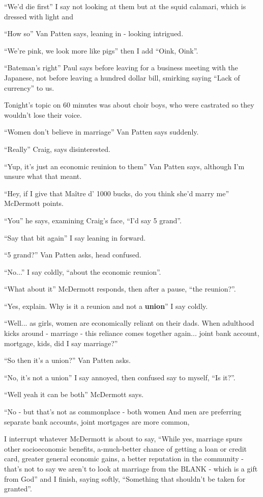 \documentclass[19pt,openany]{book}
\begin{document}
``We'd die first'' I say not looking at them
but at the squid calamari, which is dressed
with light and

``How so'' Van Patten says, leaning in -
looking intrigued.

``We're pink, we look more like pigs'' then
I add ``Oink, Oink''.

``Bateman's right'' Paul says
before leaving for
a business meeting with the Japanese, not
before leaving a hundred dollar bill,
smirking saying ``Lack of currency'' to us.

Tonight's topic on
60 minutes was about choir boys, who were
castrated so they wouldn't lose their voice.

``Women don't believe in marriage'' Van Patten says
suddenly.

``Really'' Craig, says disinterested.

``Yup, it's just an economic reuinion to them'' Van
Patten says, although I'm unsure what
that meant.

``Hey, if I give that Maître d' 1000 bucks,
do you think she'd marry me'' McDermott points.

``You'' he says, examining Craig's face, ``I'd
say 5 grand''.

``Say that bit again'' I say leaning in forward.

``5 grand?'' Van Patten asks, head confused.

``No...'' I say coldly, ``about the economic
reunion''.

``What about it'' McDermott responds, then
after a pause, ``the reunion?''.

``Yes, explain. Why is
it a reunion and not a
\textbf{union}'' I say coldly.

``Well... as girls,
women are economically
reliant on their dads.
When adulthood kicks
around - marriage - this
reliance comes together
again... joint bank
account, mortgage,
kids, did I say marriage?''

``So then it's a union?'' Van Patten
asks.

``No, it's not a union''
I say annoyed, then
confused say to myself, ``Is it?''.

``Well yeah it can be both''
McDermott says.

``No - but that's not
as commonplace - both
women And men are preferring
separate bank accounts,
joint mortgages are
more common,

I interrupt whatever
McDermott is about to say,
``While yes,
marriage spurs other
socioeconomic benefits,
a-much-better chance
of getting a loan or
credit card, greater
general economic gains,
a better reputation
in the community - that's
not to say we aren't
to look at marriage from the
BLANK - which
is a gift from God''
and I finish, saying
softly, ``Something
that shouldn't
be taken for granted''.
\end{document}
